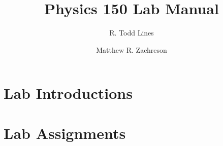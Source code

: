 \documentclass[twoside,11pt,ShortChapTitles]{BYUTextbook}
\title{Physics 150 Lab Manual}
\author{R. Todd Lines \and Matthew R. Zachreson}
\begin{document}
\maketitle
\tableofcontents
\part{Lab Introductions}



\part{Lab Assignments}
\setcounter{chapter}{0}
\renewcommand{\chaptername}{Lab}



\end{document}

